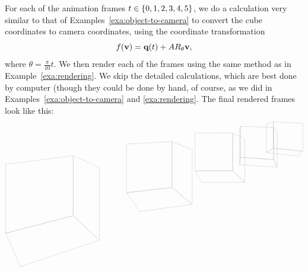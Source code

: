 \begin{solution}
  For each of the animation frames $t\in\left\{0,1,2,3,4,5\right\}$, we do a
  calculation very similar to that of
  Examples~\ref{exa:object-to-camera} to convert the cube coordinates
  to camera coordinates, using the coordinate transformation
  \begin{equation*}
    f(\mbox{\bf v}) = \mbox{\bf q}(t) + AR_{\theta}\mbox{\bf v},
  \end{equation*}
  where $\theta=\frac{\pi}{10}t$. We then render each of the frames
  using the same method as in Example~\ref{exa:rendering}. We skip the
  detailed calculations, which are best done by computer (though they
  could be done by hand, of course, as we did in
  Examples~\ref{exa:object-to-camera} and {\ref{exa:rendering}}. The
  final rendered frames look like this:
  \begin{equation*}
    \begin{tikzpicture}[scale=12]
      \draw[black!20] (-0.2979,-0.2128) -- (-0.5366,-0.2439) -- (-0.5366,-0.4878) -- (-0.2979,-0.4255) -- cycle;
      \draw[black!20] (-0.2051,-0.5128) -- (-0.2979,-0.4255) -- (-0.5366,-0.4878) -- (-0.4848,-0.6061) -- cycle;
      \draw[black!20] (-0.2051,-0.2564) -- (-0.2979,-0.2128) -- (-0.2979,-0.4255) -- (-0.2051,-0.5128) -- cycle;
      
      \draw[black!20] (0.0508,-0.1630) -- (-0.1092,-0.1721) -- (-0.1092,-0.3442) -- (0.0508,-0.3260) -- cycle;
      \draw[black!20] (0.1224,-0.3855) -- (0.0508,-0.3260) -- (-0.1092,-0.3442) -- (-0.0640,-0.4111) -- cycle;
      \draw[black!20] (0.1224,-0.1927) -- (0.0508,-0.1630) -- (0.0508,-0.3260) -- (0.1224,-0.3855) -- cycle;
      
      \draw[black!20] (0.2654,-0.1332) -- (0.1325,-0.1335) -- (0.1325,-0.2669) -- (0.2654,-0.2664) -- cycle;
      \draw[black!20] (0.3085,-0.3073) -- (0.2654,-0.2664) -- (0.1325,-0.2669) -- (0.1552,-0.3080) -- cycle;
      \draw[black!20] (0.3085,-0.1537) -- (0.2654,-0.1332) -- (0.2654,-0.2664) -- (0.3085,-0.3073) -- cycle;

      \draw[black!20] (0.2907,-0.1224) -- (0.2907,-0.2448) -- (0.2925,-0.2192) -- (0.2925,-0.1096) -- cycle;
      \draw[black!20] (0.4105,-0.1132) -- (0.2925,-0.1096) -- (0.2925,-0.2192) -- (0.4105,-0.2265) -- cycle;
      \draw[black!20] (0.4229,-0.2540) -- (0.4105,-0.2265) -- (0.2925,-0.2192) -- (0.2907,-0.2448) -- cycle;
      \draw[black!20] (0.4229,-0.1270) -- (0.4105,-0.1132) -- (0.4105,-0.2265) -- (0.4229,-0.2540) -- cycle;

      \draw[black!20] (0.3850,-0.1012) -- (0.3850,-0.2025) -- (0.4094,-0.1870) -- (0.4094,-0.0935) -- cycle;
      \draw[black!20] (0.5134,-0.0988) -- (0.4094,-0.0935) -- (0.4094,-0.1870) -- (0.5134,-0.1976) -- cycle;
      \draw[black!20] (0.4967,-0.2150) -- (0.5134,-0.1976) -- (0.4094,-0.1870) -- (0.3850,-0.2025) -- cycle;


\end{tikzpicture}
\end{equation*}
\end{solution}

